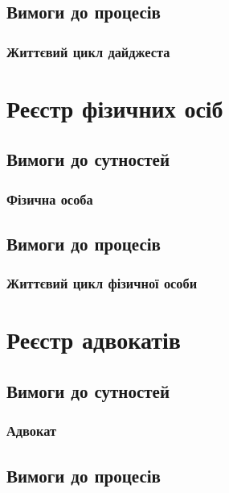 \documentclass{article}
\begin{document}
\subsection{Вимоги до процесів}

\subsubsection{Життєвий цикл дайджеста}

\newpage
\section{Реєстр фізичних осіб}

\subsection{Вимоги до сутностей}

\subsubsection{Фізична особа}

\subsection{Вимоги до процесів}

\subsubsection{Життєвий цикл фізичної особи}

\newpage
\section{Реєстр адвокатів}

\subsection{Вимоги до сутностей}

\subsubsection{Адвокат}

\subsection{Вимоги до процесів}
\end{document}
